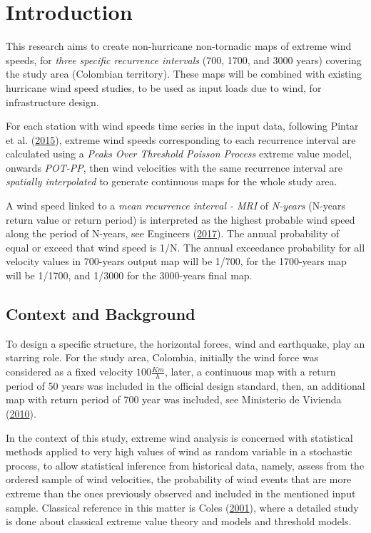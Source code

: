 \documentclass[12pt,oneside]{reedthesis}
\begin{document}
\hypertarget{introduction}{%
\chapter{Introduction}\label{introduction}}

This research aims to create non-hurricane non-tornadic maps of extreme wind speeds, for \emph{three specific recurrence intervals} (700, 1700, and 3000 years) covering the study area (Colombian territory). These maps will be combined with existing hurricane wind speed studies, to be used as input loads due to wind, for infrastructure design.

For each station with wind speeds time series in the input data, following Pintar et al. (\protect\hyperlink{ref-Pintar2015}{2015}), extreme wind speeds corresponding to each recurrence interval are calculated using a \emph{Peaks Over Threshold Poisson Process} extreme value model, onwards \emph{POT-PP}, then wind velocities with the same recurrence interval are \emph{spatially interpolated} to generate continuous maps for the whole study area.

A wind speed linked to a \emph{mean recurrence interval - MRI} of \emph{N-years} (N-years return value or return period) is interpreted as the highest probable wind speed along the period of N-years, see Engineers (\protect\hyperlink{ref-Asce2017}{2017}). The annual probability of equal or exceed that wind speed is 1/N. The annual exceedance probability for all velocity values in 700-years output map will be 1/700, for the 1700-years map will be 1/1700, and 1/3000 for the 3000-years final map.

\hypertarget{context-and-background}{%
\section{Context and Background}\label{context-and-background}}

To design a specific structure, the horizontal forces, wind and earthquake, play an starring role. For the study area, Colombia, initially the wind force was considered as a fixed velocity \(100 \frac{Km}{h}\), later, a continuous map with a return period of 50 years was included in the official design standard, then, an additional map with return period of 700 year was included, see Ministerio de Vivienda (\protect\hyperlink{ref-nsr10}{2010}).

In the context of this study, extreme wind analysis is concerned with statistical methods applied to very high values of wind as random variable in a stochastic process, to allow statistical inference from historical data, namely, assess from the ordered sample of wind velocities, the probability of wind events that are more extreme than the ones previously observed and included in the mentioned input sample. Classical reference in this matter is Coles (\protect\hyperlink{ref-Coles2001}{2001}), where a detailed study is done about classical extreme value theory and models and threshold models.
\end{document}
